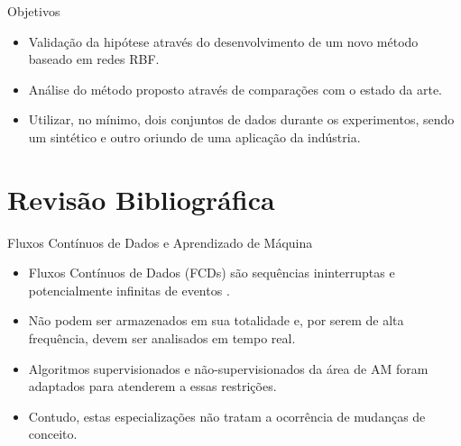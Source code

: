\documentclass[10pt]{beamer}
\begin{document}
\begin{frame}{Objetivos}
    \begin{itemize}
        \item<1 -> Validação da hipótese através do desenvolvimento de um novo método baseado em redes RBF.
        \item<2 -> Análise do método proposto através de comparações com o estado da arte.
        \item<3 -> Utilizar, no mínimo, dois conjuntos de dados durante os experimentos, sendo um sintético e outro oriundo de uma aplicação da indústria.
      \end{itemize}
\end{frame}

\section{Revisão Bibliográfica}


\begin{frame}{Fluxos Contínuos de Dados e Aprendizado de Máquina}
    \begin{itemize}
        \item<1 -> \alert{Fluxos Contínuos de Dados (FCDs)} são sequências ininterruptas e potencialmente infinitas de eventos \cite{Aggarwal:2006:DSM:1196418}.
        \item<2 -> Não podem ser armazenados em sua totalidade e, por serem de alta frequência, devem ser analisados em tempo real.
        \item<3 -> Algoritmos supervisionados \cite{Domingos:2000:MHD:347090.347107, Bifet:2013:EDS:2480362.2480516, Wang:2003:MCD:956750.956778, Aggarwal:2004:DCD:1014052.1014110, Gama:2003:ADT:956750.956813} e não-supervisionados \cite{Aggarwal:2003:FCE:1315451.1315460, Ackermann:2012:SCA:2133803.2184450, Kranen:2011:CIM:2134350.2134352} da área de AM foram adaptados para atenderem a essas restrições.
        \item<4 -> Contudo, estas especializações não tratam a ocorrência de \alert{mudanças de conceito}.
      \end{itemize}
\end{frame}

\end{document}
